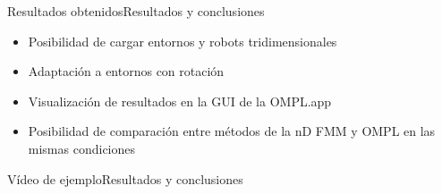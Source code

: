 \documentclass[10pt]{beamer}
\begin{document}
\begin{frame}{Resultados obtenidos}{Resultados y conclusiones}
	\begin{itemize}
		\item Posibilidad de cargar entornos y robots tridimensionales
		\item Adaptación a entornos con rotación
		\item Visualización de resultados en la GUI de la OMPL.app
		\item Posibilidad de comparación entre métodos de la nD FMM y OMPL en las mismas condiciones
	\end{itemize}
\end{frame}

\begin{frame}{Vídeo de ejemplo}{Resultados y conclusiones}
\begin{center}
\end{center}
\end{frame}


{\aauwavesbg
	\begin{frame}
	\end{frame}}
\end{document}
